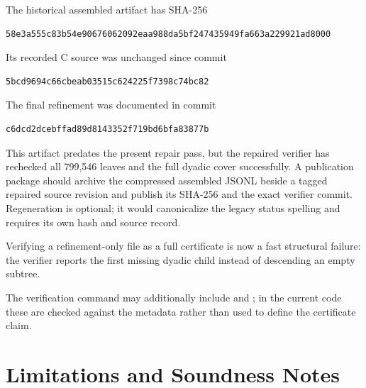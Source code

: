 \documentclass[11pt]{article}
\DeclareRobustCommand{\code}[1]{\texttt{\detokenize{#1}}}
\begin{document}
The historical assembled artifact has SHA-256
\begin{lstlisting}
58e3a555c83b54e90676062092eaa988da5bf247435949fa663a229921ad8000
\end{lstlisting}
Its recorded C source was unchanged since commit
\begin{lstlisting}
5bcd9694c66cbeab03515c624225f7398c74bc82
\end{lstlisting}
The final refinement was documented in commit
\begin{lstlisting}
c6dcd2dcebffad89d8143352f719bd6bfa83877b
\end{lstlisting}
This artifact predates the
present repair pass, but the repaired verifier has rechecked all 799,546 leaves
and the full dyadic cover successfully.  A publication package should archive
the compressed assembled JSONL beside a tagged repaired source revision and
publish its SHA-256 and the exact verifier commit.  Regeneration is optional;
it would canonicalize the legacy status spelling and requires its own hash and
source record.

Verifying a refinement-only file as a full certificate is now a fast structural
failure: the verifier reports the first missing dyadic child instead of
descending an empty subtree.

The verification command may additionally include \code{--theta 1.0496} and
\code{--form centered}; in the current code these are checked against the
metadata rather than used to define the certificate claim.

\section{Limitations and Soundness Notes}
\end{document}
